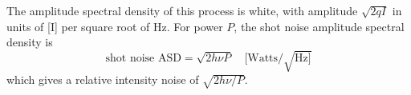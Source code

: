 The amplitude spectral density of this process is white, with
amplitude $\sqrt{2qI}$ in units of [I] per square root of Hz.
For power $P$, the shot noise amplitude spectral density is 
\begin{equation}
\text{shot noise ASD} = \sqrt{2 h\nu P}\quad [\text{Watts}/\sqrt{\text{Hz}]}
\label{eq:shotnoise-asd}
\end{equation}
which gives a relative intensity noise of $\sqrt{2 h\nu/P}$.


